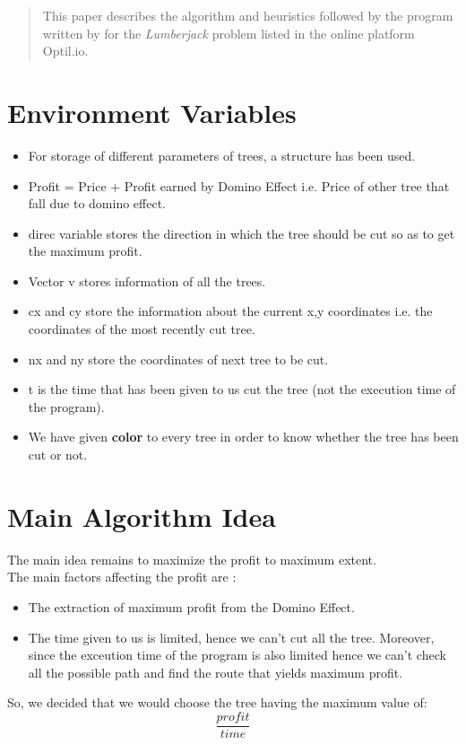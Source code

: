 \documentclass[12pt]{article}
\begin{document}
\maketitle

\begin{abstract} %
This paper describes the algorithm and heuristics followed by the program written by \myteam for the \textit{Lumberjack} problem listed in the online platform Optil.io.
\end{abstract}

\section{Environment Variables}
    \begin{itemize}
        \item For storage of different parameters of trees, a structure has been used.
        \item Profit = Price + Profit earned by Domino Effect i.e. Price of other tree that fall due to domino effect.
        \item direc variable stores the direction in which the tree should be cut so as to get the maximum profit.
        \item Vector v stores information of all the trees.
        \item c\textunderscore x and c\textunderscore y store the information about the current x,y coordinates i.e. the coordinates of the most recently cut tree.
        \item n\textunderscore x and n\textunderscore y store the coordinates of next tree to be cut.
        \item t is the time that has been given to us cut the tree (not the execution time of the program).
		\item We have given \textbf{color} to every tree in order to know whether the tree has been cut or not.
    \end{itemize}
    
\section{Main Algorithm Idea}
The main idea remains to maximize the profit to maximum extent.\\
    

The main factors affecting the profit are : 
    \begin{itemize}
        \item The extraction of maximum profit from the Domino Effect.
        \item The time given to us is limited, hence we can't cut all the tree. Moreover, since 
		the exceution time of the program is also limited hence we can't check all the possible path and find the route 
		that yields maximum profit.
    \end{itemize}
	So, we decided that we would choose the tree having the maximum value of:
	\begin{equation}
		\frac{profit}{time}
	\end{equation}
\end{document}
